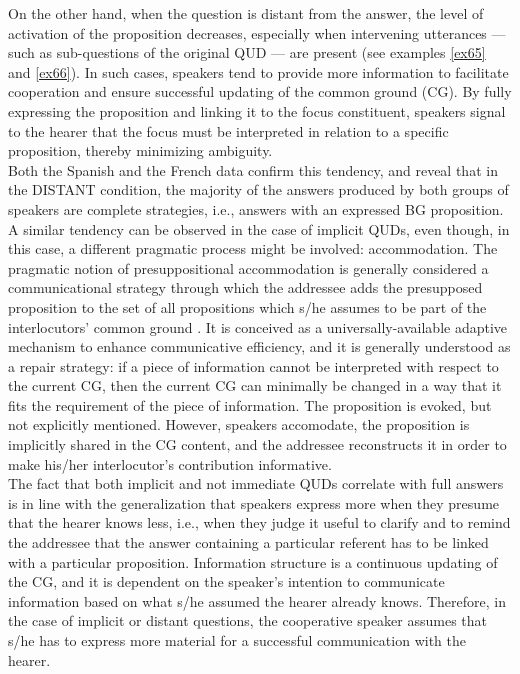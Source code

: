 On the other hand, when the question is distant from the answer, the level of activation of the proposition decreases, especially when intervening utterances — such as sub-questions of the original QUD — are present (see examples \ref{ex65} and \ref{ex66}). In such cases, speakers tend to provide more information to facilitate cooperation and ensure successful updating of the common ground (CG). By fully expressing the proposition and linking it to the focus constituent, speakers signal to the hearer that the focus must be interpreted in relation to a specific proposition, thereby minimizing ambiguity. \\
Both the Spanish and the French data confirm this tendency, and reveal that in the {\selectfont DISTANT} condition, the majority of the answers produced by both groups of speakers are complete strategies, i.e., answers with an expressed BG proposition.
A similar tendency can be observed in the case of implicit QUDs, even though, in this case, a different pragmatic process might be involved: accommodation. The pragmatic  notion  of  presuppositional  accommodation \parencite{lewis1979scorekeeping} is generally considered a communicational strategy through which the addressee adds the presupposed proposition to the set of all propositions which s/he assumes to be part of the interlocutors’ common ground \parencite{beaver2007accommodation}. It is conceived as a universally-available adaptive mechanism to enhance communicative efficiency, and it is generally understood as a repair strategy: if a piece of information cannot be interpreted with respect to the current CG, then the current CG can minimally be changed in a way that it fits the requirement of the piece of information. The proposition is evoked, but not explicitly mentioned. However, speakers accomodate, the proposition is implicitly shared in the CG content, and the addressee reconstructs it in order to make his/her interlocutor's contribution informative. \\
The fact that both implicit and not immediate QUDs correlate with full answers is in line with the generalization that speakers express more when they presume that the hearer knows less, i.e., when they judge it useful  to clarify and to remind the addressee that the answer containing a particular referent has to be linked with a particular proposition.
Information structure is a continuous updating of  the  CG, and it is  dependent on the  speaker’s  intention  to communicate information based on what s/he assumed the hearer already knows. Therefore, in the case of implicit or distant questions, the cooperative speaker assumes that s/he has to express more material for a successful communication with the hearer. \\
